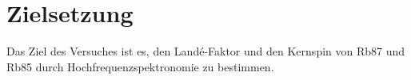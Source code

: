\section{Zielsetzung}
\label{sec:zielsetzung}
Das Ziel des Versuches ist es, den Landé-Faktor und den Kernspin von Rb87 und Rb85 durch Hochfrequenzspektronomie zu bestimmen.
